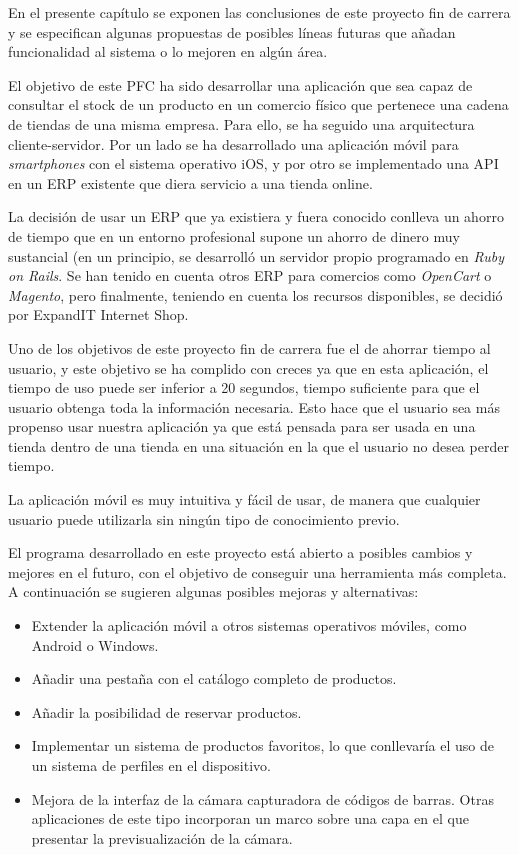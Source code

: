 
En el presente capítulo se exponen las conclusiones de este proyecto fin de carrera y se especifican algunas propuestas de posibles líneas futuras que añadan funcionalidad al sistema o lo mejoren en algún área.

El objetivo de este PFC ha sido desarrollar una aplicación que sea capaz de consultar el stock de un producto en un comercio físico que pertenece una cadena de tiendas de una misma empresa. Para ello, se ha seguido una arquitectura cliente-servidor. Por un lado se ha desarrollado una aplicación móvil para \textit{smartphones} con el sistema operativo iOS, y por otro se implementado una API en un ERP existente que diera servicio a una tienda online.

La decisión de usar un ERP que ya existiera y fuera conocido conlleva un ahorro de tiempo que en un entorno profesional supone un ahorro de dinero muy sustancial (en un principio, se desarrolló un servidor propio programado en \textit{Ruby on Rails}. Se han tenido en cuenta otros ERP para comercios como \textit{OpenCart} o \textit{Magento}, pero finalmente, teniendo en cuenta los recursos disponibles, se decidió por ExpandIT Internet Shop.

Uno de los objetivos de este proyecto fin de carrera fue el de ahorrar tiempo al usuario, y este objetivo se ha complido con creces ya que en esta aplicación, el tiempo de uso puede ser inferior a 20 segundos, tiempo suficiente para que el usuario obtenga toda la información necesaria. Esto hace que el usuario sea más propenso usar nuestra aplicación ya que está pensada para ser usada en una tienda dentro de una tienda en una situación en la que el usuario no desea perder tiempo.

La aplicación móvil es muy intuitiva y fácil de usar, de manera que cualquier usuario puede utilizarla sin ningún tipo de conocimiento previo.

El programa desarrollado en este proyecto está abierto a posibles cambios y mejores en el futuro, con el objetivo de conseguir una herramienta más completa. A continuación se sugieren algunas posibles mejoras y alternativas:

\begin{itemize}
	\item Extender la aplicación móvil a otros sistemas operativos móviles, como Android o Windows.
	\item Añadir una pestaña con el catálogo completo de productos.
	\item Añadir la posibilidad de reservar productos.
	\item Implementar un sistema de productos favoritos, lo que conllevaría el uso de un sistema de perfiles en el dispositivo.
	\item Mejora de la interfaz de la cámara capturadora de códigos de barras. Otras aplicaciones de este tipo incorporan un marco sobre una capa en el que presentar la previsualización de la cámara.
\end{itemize}

\chapterend